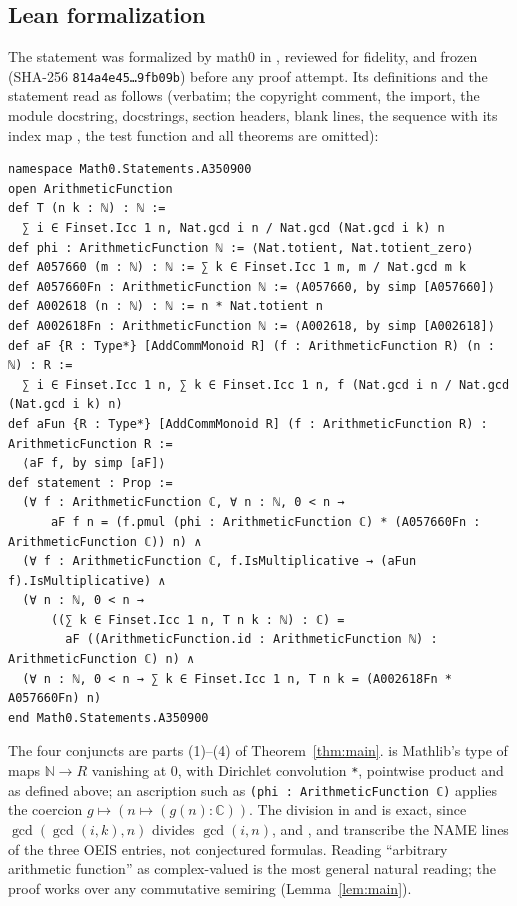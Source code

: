 \documentclass[11pt]{amsart}
\theoremstyle{plain}
\theoremstyle{definition}
\newcommand{\N}{\mathbb{N}}
\newcommand{\C}{\mathbb{C}}
\begin{document}
\subsection*{Lean formalization}
The statement was formalized by math0 in , reviewed for fidelity, and frozen (SHA-256 \texttt{814a4e45\ldots 9fb09b}) before any proof attempt. Its definitions and the statement read as follows (verbatim; the copyright comment, the import, the module docstring, docstrings, section headers, blank lines, the sequence  with its index map , the test function  and all theorems are omitted):
\begin{lstlisting}
namespace Math0.Statements.A350900
open ArithmeticFunction
def T (n k : ℕ) : ℕ :=
  ∑ i ∈ Finset.Icc 1 n, Nat.gcd i n / Nat.gcd (Nat.gcd i k) n
def phi : ArithmeticFunction ℕ := ⟨Nat.totient, Nat.totient_zero⟩
def A057660 (m : ℕ) : ℕ := ∑ k ∈ Finset.Icc 1 m, m / Nat.gcd m k
def A057660Fn : ArithmeticFunction ℕ := ⟨A057660, by simp [A057660]⟩
def A002618 (n : ℕ) : ℕ := n * Nat.totient n
def A002618Fn : ArithmeticFunction ℕ := ⟨A002618, by simp [A002618]⟩
def aF {R : Type*} [AddCommMonoid R] (f : ArithmeticFunction R) (n : ℕ) : R :=
  ∑ i ∈ Finset.Icc 1 n, ∑ k ∈ Finset.Icc 1 n, f (Nat.gcd i n / Nat.gcd (Nat.gcd i k) n)
def aFun {R : Type*} [AddCommMonoid R] (f : ArithmeticFunction R) : ArithmeticFunction R :=
  ⟨aF f, by simp [aF]⟩
def statement : Prop :=
  (∀ f : ArithmeticFunction ℂ, ∀ n : ℕ, 0 < n →
      aF f n = (f.pmul (phi : ArithmeticFunction ℂ) * (A057660Fn : ArithmeticFunction ℂ)) n) ∧
  (∀ f : ArithmeticFunction ℂ, f.IsMultiplicative → (aFun f).IsMultiplicative) ∧
  (∀ n : ℕ, 0 < n →
      ((∑ k ∈ Finset.Icc 1 n, T n k : ℕ) : ℂ) =
        aF ((ArithmeticFunction.id : ArithmeticFunction ℕ) : ArithmeticFunction ℂ) n) ∧
  (∀ n : ℕ, 0 < n → ∑ k ∈ Finset.Icc 1 n, T n k = (A002618Fn * A057660Fn) n)
end Math0.Statements.A350900
\end{lstlisting}
The four conjuncts are parts (1)--(4) of Theorem~\ref{thm:main}.
 is Mathlib's type of maps $\N\to R$ vanishing at $0$, with Dirichlet convolution \texttt{*}, pointwise product  and  as defined above; an ascription such as \texttt{(phi : ArithmeticFunction ℂ)} applies the coercion $g\mapsto(n\mapsto(g(n):\C))$. The division in  and  is exact, since $\gcd(\gcd(i,k),n)$ divides $\gcd(i,n)$, and ,  and  transcribe the NAME lines of the three OEIS entries, not conjectured formulas. Reading ``arbitrary arithmetic function'' as complex-valued is the most general natural reading; the proof works over any commutative semiring (Lemma~\ref{lem:main}).
\end{document}
